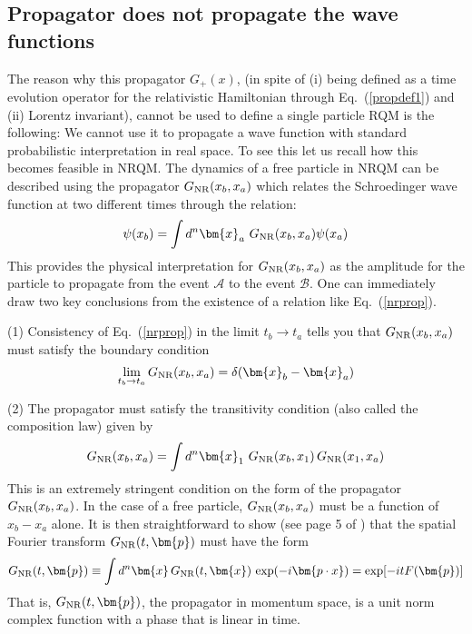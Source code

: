 \documentclass[12pt]{article}
\def\eq#1{{Eq.~(\ref{#1})}}
\begin{document}
\subsection{Propagator does not propagate the wave functions}


The  reason why this propagator $G_+(x)$, (in spite of (i) being  defined as a time evolution operator for the relativistic Hamiltonian through \eq{propdef1} and (ii)
 Lorentz invariant), cannot be used to define a  single particle RQM is the following: We cannot use it to propagate a wave function with standard probabilistic interpretation in real space. To see this let us recall how this becomes feasible in NRQM.
The dynamics of a free particle in NRQM  can be described using the propagator $G_{\rm NR}(x_b, x_a)$ which relates the Schroedinger wave function at two different times through the relation:
\begin{equation}
 \psi(x_b) = \int d^n \bm{x}_a\ G_{\rm NR}(x_b, x_a) \psi(x_a)
 \label{nrprop} 
\end{equation} 
This provides the physical interpretation for $G_{\rm NR}(x_b, x_a)$ as the amplitude for the particle to propagate from the event $\mathcal{A}$ to the event $\mathcal{B}$. One can immediately draw two key conclusions from the existence of  a relation like \eq{nrprop}.


(1) Consistency of \eq{nrprop} in the limit $t_b\to t_a$ tells you that $G_{\rm NR}(x_b, x_a)$ must satisfy the boundary condition 
 \begin{equation}
  \lim_{t_b\to t_a} G_{\rm NR}(x_b, x_a)=\delta(\bm{x}_b - \bm{x}_a)
  \label{coin1}
 \end{equation} 
 

(2) The propagator must satisfy the transitivity condition (also called the composition law) given by 
 \begin{equation}
  G_{\rm NR}(x_b, x_a) = \int d^n\bm{x}_1\ G_{\rm NR}(x_b, x_1)\,G_{\rm NR}(x_1, x_a)
  \label{complaw}
 \end{equation} 
 This is an extremely stringent condition on the form of the propagator $G_{\rm NR}(x_b, x_a)$. In the case of a free particle,  $G_{\rm NR}(x_b, x_a)$ must be a function of $x_b-x_a$ alone. It is then straightforward to show (see page 5 of \cite{tpqft}) that the spatial Fourier transform $G_{\rm NR}(t, \bm{p})$ must have the form 
 \begin{equation}
  G_{\rm NR}(t, \bm{p}) \equiv \int d^n \bm{x}\, G_{\rm NR}(t, \bm{x})\, \exp(-i\bm{p\cdot x}) = \exp[-itF({\bm{p}})]
  \label{spaceft1}
 \end{equation} 
 That is, $ G_{\rm NR}(t, \bm{p})$, the propagator in momentum space, is a unit norm complex function with a phase that is linear in time. 
 
\end{document}
